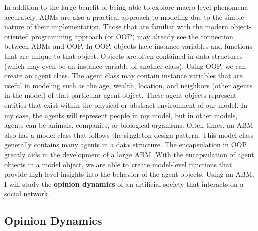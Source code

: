 In addition to the large benefit of being able to explore macro level phenomena accurately, ABMs are also a practical approach to modeling due to the simple nature of their implementation. Those that are familiar with the modern object-oriented programming approach (or OOP) may already see the connection between ABMs and OOP. In OOP, objects have instance variables and functions that are unique to that object. Objects are often contained in data structures (which may even be an instance variable of another class). Using OOP, we can create an agent class. The agent class may contain instance variables that are useful in modeling such as the age, wealth, location, and neighbors (other agents in the model) of that particular agent object. These agent objects represent entities that exist within the physical or abstract environment of our model. In my case, the agents will represent people in my model, but in other models, agents can be animals, companies, or biological organisms. Often times, an ABM also has a model class that follows the singleton design pattern. This model class generally contains many agents in a data structure. The encapsulation in OOP greatly aids in the development of a large ABM. With the encapsulation of agent objects in a model object, we are able to create model-level functions that provide high-level insights into the behavior of the agent objects. Using an ABM, I will study the \textbf{opinion dynamics} of an artificial society that interacts on a social network.


\subsection{Opinion Dynamics}
